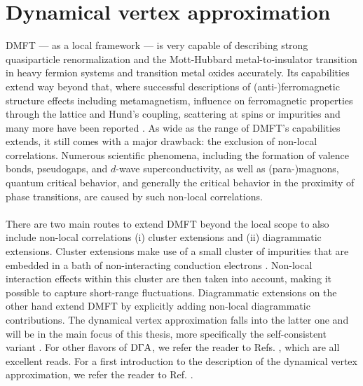 \documentclass[\main/main.tex]{subfiles}
\begin{document}
\section{Dynamical vertex approximation}\label{sec:dga}

DMFT --- as a local framework --- is very capable of describing strong quasiparticle renormalization and the Mott-Hubbard metal-to-insulator transition in heavy fermion systems and transition metal oxides accurately. Its capabilities extend way beyond that, where successful descriptions of (anti-)ferromagnetic structure effects including metamagnetism, influence on ferromagnetic properties through the lattice and Hund's coupling, scattering at spins or impurities and many more have been reported \cite{Held2007, Kotliar2006}. As wide as the range of DMFT's capabilities extends, it still comes with a major drawback: the exclusion of non-local correlations. Numerous scientific phenomena, including the formation of valence bonds, pseudogaps, and $d$-wave superconductivity, as well as (para-)magnons, quantum critical behavior, and generally the critical behavior in the proximity of phase transitions, are caused by such non-local correlations.
\\\\
There are two main routes to extend DMFT beyond the local scope to also include non-local correlations \cite{Rohringer2012} (i) cluster extensions and (ii) diagrammatic extensions. Cluster extensions make use of a small cluster of impurities that are embedded in a bath of non-interacting conduction electrons \cite{Slezak2009}. Non-local interaction effects within this cluster are then taken into account, making it possible to capture short-range fluctuations. Diagrammatic extensions on the other hand extend DMFT by explicitly adding non-local diagrammatic contributions. The dynamical vertex approximation falls into the latter one and will be in the main focus of this thesis, more specifically the self-consistent  variant \cite{Kaufmann2021}. For other flavors of $\text{D}\Gamma\text{A}$, we refer the reader to Refs. \cite{DelRe2021, Valli2015, Schafer2021, Katanin2009, Held2008, Stobbe2022, Augustinsky2011, Tam2013}, which are all excellent reads. For a first introduction to the  description of the dynamical vertex approximation, we refer the reader to Ref. \cite{Toschi2007}. 
\\\\
\end{document}
